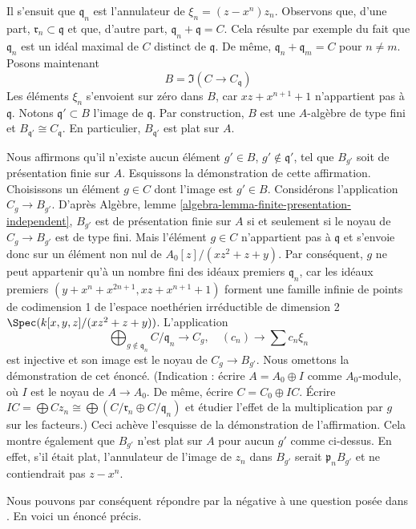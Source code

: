 Il s'ensuit que $\mathfrak q_n$ est l'annulateur de $\xi_n = (z - x^n)z_n$.
Observons que, d'une part, $\mathfrak r_n \subset \mathfrak q$ et que,
d'autre part, $\mathfrak q_n + \mathfrak q = C$. Cela résulte par exemple du fait
que $\mathfrak q_n$ est un idéal maximal de $C$ distinct de $\mathfrak q$.
De même, $\mathfrak q_n + \mathfrak q_m = C$ pour $n \not = m$.
Posons maintenant
$$
B = \Im(C \longrightarrow C_{\mathfrak q})
$$
Les éléments $\xi_n$ s'envoient sur zéro dans $B$, car $xz + x^{n + 1} + 1$
n'appartient pas à $\mathfrak q$. Notons $\mathfrak q' \subset B$ l'image de
$\mathfrak q$. Par construction, $B$ est une $A$-algèbre de type fini et
$B_{\mathfrak q'} \cong C_{\mathfrak q}$. En particulier,
$B_{\mathfrak q'}$ est plat sur $A$.

\medskip\noindent
Nous affirmons qu'il n'existe aucun élément $g' \in B$, $g' \not \in \mathfrak q'$,
tel que $B_{g'}$ soit de présentation finie sur $A$. Esquissons la démonstration de
cette affirmation. Choisissons un élément $g \in C$ dont l'image est $g' \in B$.
Considérons l'application $C_g \to B_{g'}$. D'après
Algèbre, lemme \ref{algebra-lemma-finite-presentation-independent},
$B_{g'}$ est de présentation finie sur $A$ si et seulement si le noyau
de $C_g \to B_{g'}$ est de type fini. Mais l'élément $g \in C$
n'appartient pas à $\mathfrak q$ et s'envoie donc sur un élément non nul de
$A_0[z]/(xz^2 + z + y)$. Par conséquent, $g$ ne peut appartenir qu'à un nombre fini
des idéaux premiers $\mathfrak q_n$, car les idéaux premiers
$(y + x^n + x^{2n + 1}, xz + x^{n + 1} + 1)$ forment une famille infinie
de points de codimension 1 de l'espace noethérien irréductible de dimension 2
$\Spec(k[x, y, z]/(xz^2 + z + y))$. L'application
$$
\bigoplus\nolimits_{g \not \in \mathfrak q_n} C/\mathfrak q_n
\longrightarrow
C_g, \quad
(c_n) \longrightarrow \sum c_n \xi_n
$$
est injective et son image est le noyau de $C_g \to B_{g'}$. Nous omettons la
démonstration de cet énoncé. (Indication : écrire $A = A_0 \oplus I$ comme $A_0$-module,
où $I$ est le noyau de $A \to A_0$. De même, écrire $C = C_0 \oplus IC$.
Écrire
$IC = \bigoplus Cz_n \cong \bigoplus (C/\mathfrak r_n \oplus C/\mathfrak q_n)$
et étudier l'effet de la multiplication par $g$ sur les facteurs.)
Ceci achève l'esquisse de la démonstration de l'affirmation.
Cela montre également que $B_{g'}$ n'est plat sur $A$ pour aucun $g'$ comme ci-dessus.
En effet, s'il était plat, l'annulateur de l'image de $z_n$ dans
$B_{g'}$ serait $\mathfrak p_nB_{g'}$ et ne contiendrait pas $z - x^n$.

\medskip\noindent
Nous pouvons par conséquent répondre par la négative à une question posée dans
\cite[Part I, Remarques (3.4.7) ()]{GruRay}.
En voici un énoncé précis.

